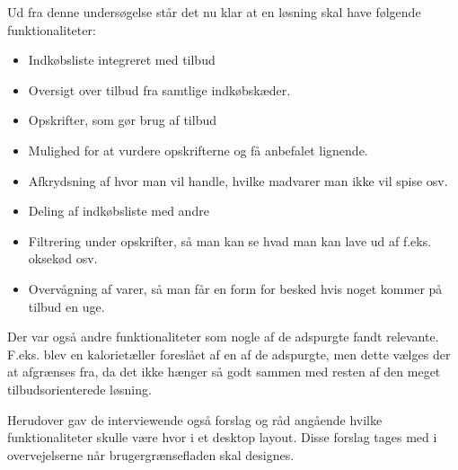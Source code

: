 Ud fra denne undersøgelse står det nu klar at en løsning skal have følgende funktionaliteter:

\begin{itemize}
	\item Indkøbsliste integreret med tilbud
	\item Oversigt over tilbud fra samtlige indkøbskæder.
	\item Opskrifter, som gør brug af tilbud
	\item Mulighed for at vurdere opskrifterne og få anbefalet lignende.
	\item Afkrydsning af hvor man vil handle, hvilke madvarer man ikke vil spise osv.
	\item Deling af indkøbsliste med andre
	\item Filtrering under opskrifter, så man kan se hvad man kan lave ud af f.eks. oksekød osv.
	\item Overvågning af varer, så man får en form for besked hvis noget kommer på tilbud en uge.
\end{itemize}

Der var også andre funktionaliteter som nogle af de adspurgte fandt relevante.
F.eks. blev en kalorietæller foreslået af en af de adspurgte, men dette vælges der at afgrænses fra, da det ikke hænger så godt sammen med resten af den meget tilbudsorienterede løsning.

Herudover gav de interviewende også forslag og råd angående hvilke funktionaliteter skulle være hvor i et desktop layout.
Disse forslag tages med i overvejelserne når brugergrænsefladen skal designes.
